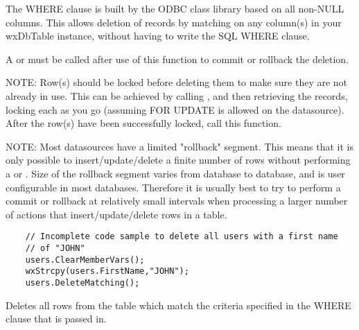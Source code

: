 The WHERE clause is built by the ODBC class library based on all non-NULL 
columns.  This allows deletion of records by matching on any column(s) in 
your wxDbTable instance, without having to write the SQL WHERE clause.

A  or 
 must be called after use of 
this function to commit or rollback the deletion.

NOTE: Row(s) should be locked before deleting them to make sure they are 
not already in use.  This can be achieved by calling 
, 
and then retrieving the records, locking each as you go (assuming FOR UPDATE 
is allowed on the datasource).  After the row(s) have been successfully locked, 
call this function.

NOTE: Most datasources have a limited "rollback" segment.  This means 
that it is only possible to insert/update/delete a finite number of rows 
without performing a  or 
.  Size of the rollback 
segment varies from database to database, and is user configurable in 
most databases.  Therefore it is usually best to try to perform a commit 
or rollback at relatively small intervals when processing a larger number 
of actions that insert/update/delete rows in a table.



\begin{verbatim}
    // Incomplete code sample to delete all users with a first name
    // of "JOHN"
    users.ClearMemberVars();
    wxStrcpy(users.FirstName,"JOHN");
    users.DeleteMatching();
\end{verbatim}


\label{wxdbtabledeletewhere}


Deletes all rows from the table which match the criteria specified in the 
WHERE clause that is passed in.



